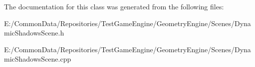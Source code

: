 The documentation for this class was generated from the following files\+:\begin{DoxyCompactItemize}
\item 
E\+:/\+Common\+Data/\+Repositories/\+Test\+Game\+Engine/\+Geometry\+Engine/\+Scenes/Dynamic\+Shadows\+Scene.\+h\item 
E\+:/\+Common\+Data/\+Repositories/\+Test\+Game\+Engine/\+Geometry\+Engine/\+Scenes/Dynamic\+Shadows\+Scene.\+cpp\end{DoxyCompactItemize}
